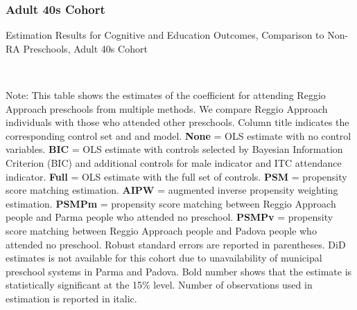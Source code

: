 \subsubsection{Adult 40s Cohort}
\begin{table}[H] \caption{Estimation Results for Cognitive and Education Outcomes, Comparison to Non-RA Preschools, Adult 40s Cohort} \label{ols-CN-adult40-reg-other}
\scalebox{0.8}{}
\vspace{1ex} \\
\footnotesize\raggedright{Note: This table shows the estimates of the coefficient for attending Reggio Approach preschools from multiple methods. We compare Reggio Approach individuals with those who attended other preschools. Column title indicates the corresponding control set and and model. \textbf{None} = OLS estimate with no control variables. \textbf{BIC} = OLS estimate with controls selected by Bayesian Information Criterion (BIC) and additional controls for male indicator and ITC attendance indicator. \textbf{Full} = OLS estimate with the full set of controls. \textbf{PSM} =  propensity score matching estimation. \textbf{AIPW} = augmented inverse propensity weighting estimation. \textbf{PSMPm} = propensity score matching between Reggio Approach people and Parma people who attended no preschool.  \textbf{PSMPv} = propensity score matching between Reggio Approach people and Padova people who attended no preschool. Robust standard errors are reported in parentheses. DiD estimates is not available for this cohort due to unavailability of municipal preschool systems in Parma and Padova. Bold number shows that the estimate is statistically significant at the 15\% level. Number of observations used in estimation is reported in italic.}
\end{table}

